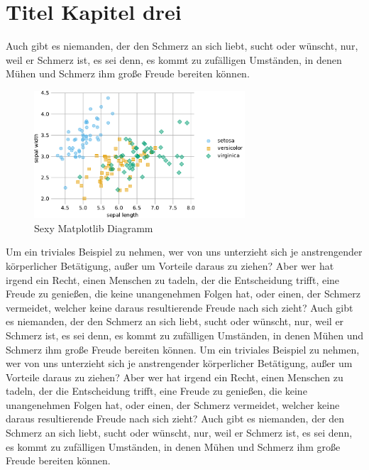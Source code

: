 \documentclass[12pt]{report}
\begin{document}
\chapter{Titel Kapitel drei}
Auch gibt es niemanden, der den Schmerz an sich liebt, sucht oder wünscht, nur, weil er Schmerz ist,
es sei denn, es kommt zu zufälligen Umständen, in denen Mühen und Schmerz ihm große Freude bereiten
können. 
\begin{figure}
    \includegraphics[width=0.7\textwidth]{iris}
    \caption{Sexy Matplotlib Diagramm}
\end{figure}
Um ein triviales Beispiel zu nehmen, wer von uns unterzieht sich je anstrengender körperlicher
Betätigung, außer um Vorteile daraus zu ziehen? Aber wer hat irgend ein Recht, einen Menschen zu
tadeln, der die Entscheidung trifft, eine Freude zu genießen, die keine unangenehmen Folgen hat,
oder einen, der Schmerz vermeidet, welcher keine daraus resultierende Freude nach sich zieht?
Auch gibt es niemanden, der den Schmerz an sich liebt, sucht oder wünscht, nur, weil er Schmerz ist,
es sei denn, es kommt zu zufälligen Umständen, in denen Mühen und Schmerz ihm große Freude bereiten
können. Um ein triviales Beispiel zu nehmen, wer von uns unterzieht sich je anstrengender körperlicher
Betätigung, außer um Vorteile daraus zu ziehen?\cite{Gamma.2015} Aber wer hat irgend ein Recht, einen Menschen zu
tadeln, der die Entscheidung trifft, eine Freude zu genießen, die keine unangenehmen Folgen hat,
oder einen, der Schmerz vermeidet, welcher keine daraus resultierende Freude nach sich zieht? Auch
gibt es niemanden, der den Schmerz an sich liebt, sucht oder wünscht, nur, weil er Schmerz ist, es
sei denn, es kommt zu zufälligen Umständen, in denen Mühen und Schmerz ihm große Freude bereiten
können.
\end{document}
